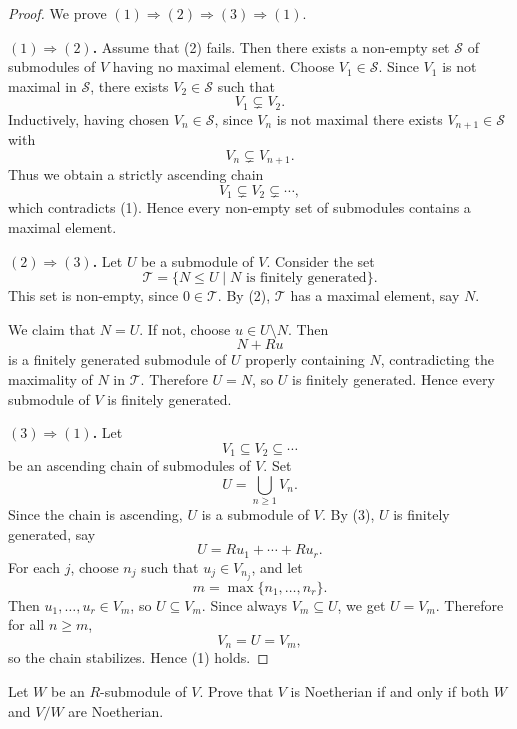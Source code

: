 \begin{proof}
    We prove $(1)\Rightarrow(2)\Rightarrow(3)\Rightarrow(1)$.

    \medskip
    \noindent\textbf{$(1)\Rightarrow(2)$.}
    Assume that \textup{(2)} fails.
    Then there exists a non-empty set $\mathcal{S}$ of submodules of $V$ having no maximal element.
    Choose $V_1\in\mathcal{S}$.
    Since $V_1$ is not maximal in $\mathcal{S}$, there exists $V_2\in\mathcal{S}$ such that
    \[
        V_1\subsetneq V_2.
    \]
    Inductively, having chosen $V_n\in\mathcal{S}$, since $V_n$ is not maximal there exists $V_{n+1}\in\mathcal{S}$ with
    \[
        V_n\subsetneq V_{n+1}.
    \]
    Thus we obtain a strictly ascending chain
    \[
        V_1\subsetneq V_2\subsetneq \cdots,
    \]
    which contradicts \textup{(1)}.
    Hence every non-empty set of submodules contains a maximal element.

    \medskip
    \noindent\textbf{$(2)\Rightarrow(3)$.}
    Let $U$ be a submodule of $V$.
    Consider the set
    \[
        \mathcal{T}=\{N\le U \mid N \text{ is finitely generated}\}.
    \]
    This set is non-empty, since $0\in\mathcal{T}$.
    By \textup{(2)}, $\mathcal{T}$ has a maximal element, say $N$.

    We claim that $N=U$.
    If not, choose $u\in U\setminus N$.
    Then
    \[
        N+Ru
    \]
    is a finitely generated submodule of $U$ properly containing $N$, contradicting the maximality of $N$ in $\mathcal{T}$.
    Therefore $U=N$, so $U$ is finitely generated.
    Hence every submodule of $V$ is finitely generated.

    \medskip
    \noindent\textbf{$(3)\Rightarrow(1)$.}
    Let
    \[
        V_1\subseteq V_2\subseteq \cdots
    \]
    be an ascending chain of submodules of $V$.
    Set
    \[
        U=\bigcup_{n\ge 1} V_n.
    \]
    Since the chain is ascending, $U$ is a submodule of $V$.
    By \textup{(3)}, $U$ is finitely generated, say
    \[
        U=Ru_1+\cdots+Ru_r.
    \]
    For each $j$, choose $n_j$ such that $u_j\in V_{n_j}$, and let
    \[
        m=\max\{n_1,\dots,n_r\}.
    \]
    Then $u_1,\dots,u_r\in V_m$, so $U\subseteq V_m$.
    Since always $V_m\subseteq U$, we get $U=V_m$.
    Therefore for all $n\ge m$,
    \[
        V_n=U=V_m,
    \]
    so the chain stabilizes.
    Hence \textup{(1)} holds.
\end{proof}

\begin{exercise}
    Let $W$ be an $R$-submodule of $V$. Prove that $V$ is Noetherian if and only if both $W$ and $V/W$ are Noetherian.
\end{exercise}

